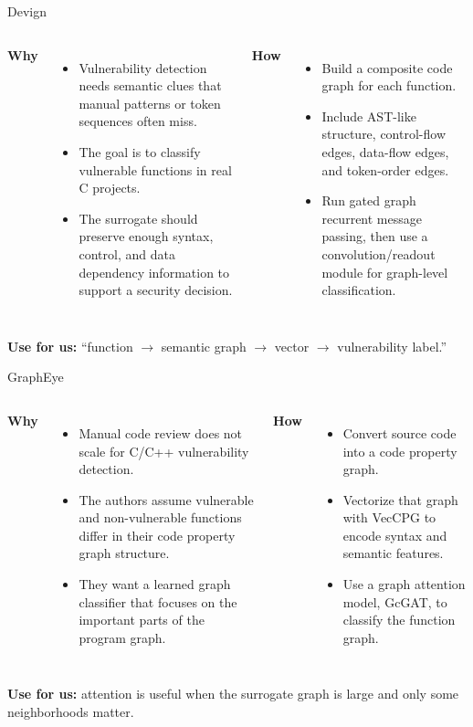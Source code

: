 \documentclass[10pt]{beamer}
\begin{document}
\begin{frame}{Devign}
  \small
  \begin{columns}[T,onlytextwidth]
    \textbf{Why}
    \begin{itemize}
      \item Vulnerability detection needs semantic clues that manual patterns or token sequences often miss.
      \item The goal is to classify vulnerable functions in real C projects.
      \item The surrogate should preserve enough syntax, control, and data dependency information to support a security decision.
    \end{itemize}

    \textbf{How}
    \begin{itemize}
      \item Build a composite code graph for each function.
      \item Include AST-like structure, control-flow edges, data-flow edges, and token-order edges.
      \item Run gated graph recurrent message passing, then use a convolution/readout module for graph-level classification.
    \end{itemize}
  \end{columns}

  \vspace{0.25cm}
  \textbf{Use for us:} ``function $\rightarrow$ semantic graph $\rightarrow$ vector $\rightarrow$ vulnerability label.''
\end{frame}

\begin{frame}{GraphEye}
  \begin{columns}[T,onlytextwidth]
    \textbf{Why}
    \begin{itemize}
      \item Manual code review does not scale for C/C++ vulnerability detection.
      \item The authors assume vulnerable and non-vulnerable functions differ in their code property graph structure.
      \item They want a learned graph classifier that focuses on the important parts of the program graph.
    \end{itemize}

    \textbf{How}
    \begin{itemize}
      \item Convert source code into a code property graph.
      \item Vectorize that graph with VecCPG to encode syntax and semantic features.
      \item Use a graph attention model, GcGAT, to classify the function graph.
    \end{itemize}
  \end{columns}

  \vspace{0.25cm}
  \textbf{Use for us:} attention is useful when the surrogate graph is large and only some neighborhoods matter.
\end{frame}
\end{document}
